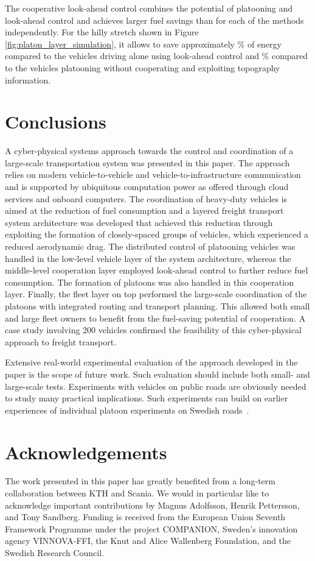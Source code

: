 \documentclass[journal]{IEEEtran}
\begin{document}
The cooperative look-ahead control combines the potential of platooning and look-ahead control and achieves larger fuel savings than for each of the methods independently. For the hilly stretch shown in Figure \ref{fig:platon_layer_simulation}, it allows to save approximately \% of energy compared to the vehicles driving alone using look-ahead control and \% compared to the vehicles platooning without cooperating and exploiting topography information.




\section{Conclusions}\label{sec_conclusions}
A cyber-physical systems approach towards the control and coordination of a large-scale transportation system was presented in this paper. The approach relies on modern vehicle-to-vehicle and vehicle-to-infrastructure communication and is supported by ubiquitous computation power as offered through cloud services and onboard computers. The coordination of heavy-duty vehicles is aimed at the reduction of fuel consumption and a layered freight transport system architecture was developed that achieved this reduction through exploiting the formation of closely-spaced groups of vehicles, which experienced a reduced aerodynamic drag. The distributed control of platooning vehicles was handled in the low-level vehicle layer of the system architecture, whereas the middle-level cooperation layer
employed look-ahead control to further reduce fuel consumption. The formation of platoons was also handled in this cooperation layer. Finally, the fleet layer on top performed the large-scale coordination of the platoons with integrated routing and transport planning. This allowed both small and large fleet owners to benefit from the fuel-saving potential of cooperation. A case study involving 200 vehicles confirmed the feasibility of this cyber-physical approach to freight transport.

Extensive real-world experimental evaluation of the approach developed in the paper is the scope of future work. Such evaluation should include both small- and large-scale tests. Experiments with vehicles on public roads are obviously needed to study many practical implications. Such experiments can build on earlier experiences of individual platoon experiments on Swedish roads~\cite{alam_2010,alam_2015b}.




\section*{Acknowledgements}
The work presented in this paper has greatly benefited from a long-term collaboration between KTH and Scania. We would in particular like to acknowledge important contributions by Magnus Adolfsson, Henrik Pettersson, and Tony Sandberg. Funding is received from the European Union Seventh Framework Programme under the project COMPANION, Sweden's innovation agency VINNOVA-FFI, the Knut and Alice Wallenberg Foundation, and the Swedish Research Council.






\end{document}
